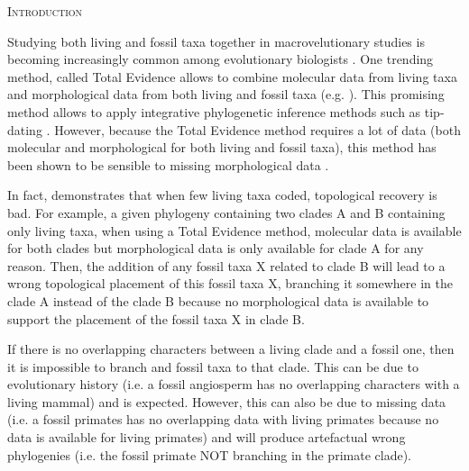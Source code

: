 \documentclass[12pt,letterpaper]{article}
\renewcommand{\section}[1]{%
\bigskip
\begin{center}
\begin{Large}
\normalfont\scshape #1
\medskip
\end{Large}
\end{center}}
\begin{document}
\section{Introduction}
Studying both living and fossil taxa together in macrovelutionary studies is becoming increasingly common among evolutionary biologists \cite{jacksonwhat2006,quentaldiversity2010,dietlconservation2011,slaterunifying2013,fritzdiversity2013}. One trending method, called Total Evidence allows to combine molecular data from living taxa and morphological data from both living and fossil taxa (e.g. \cite{pyrondivergence2011,ronquista2012,schragocombining2013,slaterunifying2013,beckancient2014,Meseguer01032015}). This promising method allows to apply integrative phylogenetic inference methods such as tip-dating \cite{ronquista2012,Drummond01082012,BEASTmaster}. However, because the Total Evidence method requires a lot of data (both molecular and morphological for both living and fossil taxa), this method has been shown to be sensible to missing morphological data \cite{GuillermeCooper}.

In fact, \cite{GuillermeCooper} demonstrates that when few living taxa coded, topological recovery is bad.
For example, a given phylogeny containing two clades A and B containing only living taxa,
when using a Total Evidence method, molecular data is available for both clades but morphological data is only available for clade A for any reason. Then, the addition of any fossil taxa X related to clade B will lead to a wrong topological placement of this fossil taxa X, branching it somewhere in the clade A instead of the clade B because no morphological data is available to support the placement of the fossil taxa X in clade B.  

If there is no overlapping characters between a living clade and a fossil one, then it is impossible to branch and fossil taxa to that clade. This can be due to evolutionary history (i.e. a fossil angiosperm has no overlapping characters with a living mammal) and is expected. However, this can also be due to missing data (i.e. a fossil primates has no overlapping data with living primates because no data is available for living primates) and will produce artefactual wrong phylogenies (i.e. the fossil primate NOT branching in the primate clade).
\end{document}
